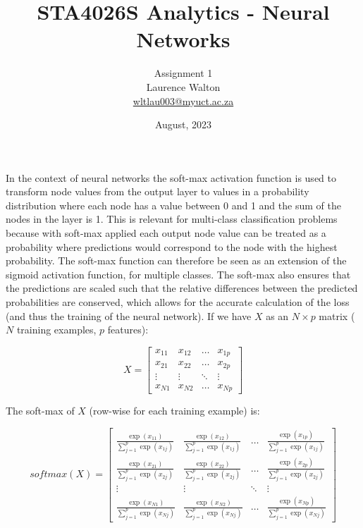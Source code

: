 \documentclass[12pt]{article}
\begin{document}
\title{STA4026S Analytics - Neural Networks}

\author{Assignment 1\\
        Laurence Walton\\
        \href{mailto:wltlau003@myuct.ac.za}{wltlau003@myuct.ac.za}
}
\date{August, 2023}

\maketitle
\subsubsection{}
In the context of neural networks the soft-max activation function is used to transform node values from the output layer to values in a probability distribution where each node has a value between 0 and 1 and the sum of the nodes in the layer is 1. This is relevant for multi-class classification problems because with soft-max applied each output node value can be treated as a probability where predictions would correspond to the node with the highest probability. The soft-max function can therefore be seen as an extension of the sigmoid activation function, for multiple classes. The soft-max also ensures that the predictions are scaled such that the relative differences between the predicted probabilities are conserved, which allows for the accurate calculation of the loss (and thus the training of the neural network). If we have \( X \) as an \( N \times p \) matrix (\(N \) training examples, \(p \) features):

\[ X = \begin{bmatrix} 
x_{11} & x_{12} & \ldots & x_{1p} \\ 
x_{21} & x_{22} & \ldots & x_{2p} \\ 
\vdots & \vdots & \ddots & \vdots \\ 
x_{N1} & x_{N2} & \ldots & x_{Np} 
\end{bmatrix} \]

The soft-max of \( X \) (row-wise for each training example) is:

\[ softmax(X) = \begin{bmatrix} 
\frac{\exp(x_{11})}{\sum_{j=1}^{p} \exp(x_{1j})} & \frac{\exp(x_{12})}{\sum_{j=1}^{p} \exp(x_{1j})} & \ldots & \frac{\exp(x_{1p})}{\sum_{j=1}^{p} \exp(x_{1j})} \\ 
\frac{\exp(x_{21})}{\sum_{j=1}^{p} \exp(x_{2j})} & \frac{\exp(x_{22})}{\sum_{j=1}^{p} \exp(x_{2j})} & \ldots & \frac{\exp(x_{2p})}{\sum_{j=1}^{p} \exp(x_{2j})} \\ 
\vdots & \vdots & \ddots & \vdots \\ 
\frac{\exp(x_{N1})}{\sum_{j=1}^{p} \exp(x_{Nj})} & \frac{\exp(x_{N2})}{\sum_{j=1}^{p} \exp(x_{Nj})} & \ldots & \frac{\exp(x_{Np})}{\sum_{j=1}^{p} \exp(x_{Nj})}
\end{bmatrix} \]
\end{document}
